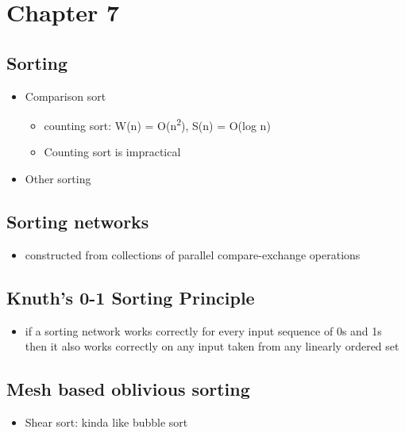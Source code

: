 \documentclass{assignments}
\begin{document}
\section*{Chapter 7}
\label{sec:orgd0c7bd9}
\subsection*{Sorting}
\label{sec:org32b43c3}
\begin{itemize}
\item Comparison sort
\begin{itemize}
\item counting sort: W(n) = O(n\textsuperscript{2}), S(n) = O(log n)
\item Counting sort is impractical
\end{itemize}
\item Other sorting
\end{itemize}
\subsection*{Sorting networks}
\label{sec:org68d1c8c}
\begin{itemize}
\item constructed from collections of parallel compare-exchange operations
\end{itemize}
\subsection*{Knuth's 0-1 Sorting Principle}
\label{sec:orgc48e5ae}
\begin{itemize}
\item if a sorting network works correctly for every input sequence of 0s and 1s
then it also works correctly on any input taken from any linearly ordered set
\end{itemize}
\subsection*{Mesh based oblivious sorting}
\label{sec:orgd71203c}
\begin{itemize}
\item Shear sort: kinda like bubble sort
\end{itemize}
\end{document}
